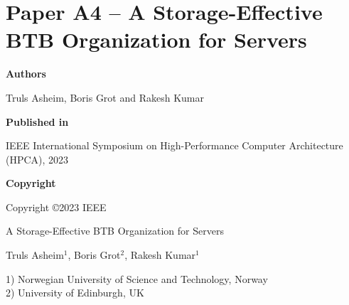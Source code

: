 \documentclass[../../../main.tex]{subfiles}
\begin{document}
\chapter{Paper A4 -- A Storage-Effective BTB Organization for Servers}
\label{chap:hpca-paper}

\noindent \textbf{Authors}

\vspace*{0.3cm}

\noindent Truls Asheim, Boris Grot and Rakesh Kumar

\vspace*{0.7cm}

\noindent \textbf{Published in}

\vspace*{0.3cm}

\noindent IEEE International Symposium on High-Performance Computer Architecture (HPCA), 2023

\vspace*{0.7cm}

\noindent \textbf{Copyright}

\vspace*{0.3cm}

\noindent Copyright ©2023 IEEE 


\newpage

\vspace*{0.1cm}

\begin{center}

\Huge{A Storage-Effective BTB Organization for Servers}

\vspace{0.6cm}

\large{Truls Asheim$^{1}$, Boris Grot$^{2}$, Rakesh Kumar$^{1}$}

\vspace{0.1cm}

\small{1) Norwegian University of Science and Technology, Norway}\\
\small{2) University of Edinburgh, UK}


\end{center}

\vspace{0.2cm}
\end{document}
